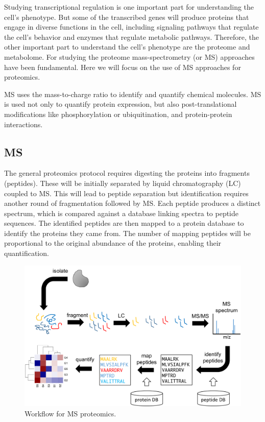 \documentclass[]{book}
\theoremstyle{definition}
\theoremstyle{definition}
\theoremstyle{definition}
\theoremstyle{remark}
\begin{document}
Studying transcriptional regulation is one important part for
understanding the cell's phenotype. But some of the transcribed genes
will produce proteins that engage in diverse functions in the cell,
including signaling pathways that regulate the cell's behavior and
enzymes that regulate metabolic pathways. Therefore, the other important
part to understand the cell's phenotype are the proteome and metabolome.
For studying the proteome mass-spectrometry (or MS) approaches have been
fundamental. Here we will focus on the use of MS approaches for
proteomics.

MS uses the mass-to-charge ratio to identify and quantify chemical
molecules. MS is used not only to quantify protein expression, but also
post-translational modifications like phosphorylation or ubiquitination,
and protein-protein interactions.

\subsection{MS}\label{ms}

The general proteomics protocol requires digesting the proteins into
fragments (peptides). These will be initially separated by liquid
chromatography (LC) coupled to MS. This will lead to peptide separation
but identification requires another round of fragmentation followed by
MS. Each peptide produces a distinct spectrum, which is compared against
a database linking spectra to peptide sequences. The identified peptides
are then mapped to a protein database to identify the proteins they came
from. The number of mapping peptides will be proportional to the
original abundance of the proteins, enabling their quantification.

\begin{figure}
\includegraphics[width=16.28in]{pic/ms} \caption{Workflow for MS proteomics.}\label{fig:ms}
\end{figure}
\end{document}
